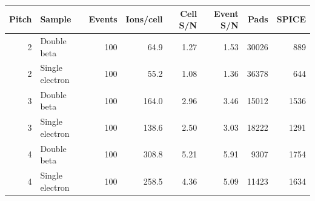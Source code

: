 \begin{tabular}{rlrrrrrr}
\toprule
Pitch & Sample & Events & Ions/cell & Cell S/N & Event S/N & Pads & SPICE \\
\midrule
2 & Double beta & 100 & 64.9 & 1.27 & 1.53 & 30026 & 889 \\
2 & Single electron & 100 & 55.2 & 1.08 & 1.36 & 36378 & 644 \\
3 & Double beta & 100 & 164.0 & 2.96 & 3.46 & 15012 & 1536 \\
3 & Single electron & 100 & 138.6 & 2.50 & 3.03 & 18222 & 1291 \\
4 & Double beta & 100 & 308.8 & 5.21 & 5.91 & 9307 & 1754 \\
4 & Single electron & 100 & 258.5 & 4.36 & 5.09 & 11423 & 1634 \\
\bottomrule
\end{tabular}
